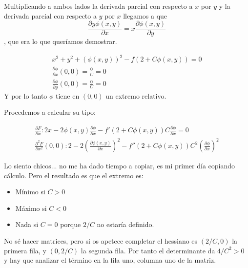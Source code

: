 \begin{problem}[1]
Multiplicando a ambos lados la derivada parcial con respecto a $x$ por $y$ y la derivada parcial con respecto a $y$ por $x$ llegamos a que \[ \frac{\partial y \phi (x,y)}{\partial  x} = x\frac{\partial  \phi (x,y)}{\partial  y} \], que era lo que queríamos demostrar.

\spart

\begin{gather*}
x^2 + y^2 + (\phi (x,y))^2 -f(2+C\phi (x,y)) = 0 \\
\frac{\partial  \phi}{\partial  x}(0,0) = \frac{0}{C} = 0 \\
\frac{\partial  \phi}{\partial  y}(0,0) = \frac{0}{C} = 0
\end{gather*}
Y por lo tanto $\phi$ tiene en $(0,0)$ un extremo relativo.

Procedemos a calcular su tipo:

\begin{gather*}
\frac{\partial  F}{\partial  x}: 2x-2\phi (x,y)\frac{\partial  \phi}{\partial  x}-f'(2+C\phi (x, y))C\frac{\partial  \phi}{\partial  x} = 0 \\
\frac{\partial  ^2 F}{\partial  x^2}(0,0): 2-2\left(\frac{\partial  \phi (x,y)}{\partial  x}\right)^2 - f''(2+C\phi (x,y))C^2\left(\frac{\partial  \phi}{\partial  x}\right)^2
\end{gather*}

Lo siento chicos... no me ha dado tiempo a copiar, es mi primer día copiando cálculo. Pero el resultado es que el extremo es:

\begin{itemize}
\item Mínimo si $C>0$
\item Máximo si $C<0$
\item Nada si $C=0$ porque $2/C$ no estaría definido.
\end{itemize}

No sé hacer matrices, pero si os apetece completar el hessiano es $(2/C, 0)$ la primera fila, y $(0, 2/C)$ la segunda fila. Por tanto el determinante da $4/C^2 > 0$ y hay que analizar el término en la fila uno, columna uno de la matriz.
\end{problem}

